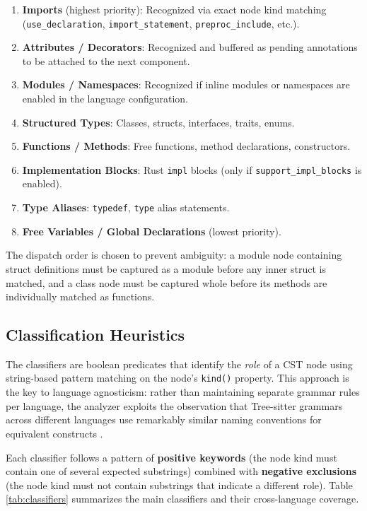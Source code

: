 \begin{enumerate}
  \item \textbf{Imports} (highest priority): Recognized via exact node kind matching (\texttt{use\_declaration}, \texttt{import\_statement}, \texttt{preproc\_include}, etc.).
  \item \textbf{Attributes / Decorators}: Recognized and buffered as pending annotations to be attached to the next component.
  \item \textbf{Modules / Namespaces}: Recognized if inline modules or namespaces are enabled in the language configuration.
  \item \textbf{Structured Types}: Classes, structs, interfaces, traits, enums.
  \item \textbf{Functions / Methods}: Free functions, method declarations, constructors.
  \item \textbf{Implementation Blocks}: Rust \texttt{impl} blocks (only if \texttt{support\_impl\_blocks} is enabled).
  \item \textbf{Type Aliases}: \texttt{typedef}, \texttt{type} alias statements.
  \item \textbf{Free Variables / Global Declarations} (lowest priority).
\end{enumerate}

The dispatch order is chosen to prevent ambiguity: a module node containing struct definitions must be captured as a module before any inner struct is matched, and a class node must be captured whole before its methods are individually matched as functions.

\subsection{Classification Heuristics}
\label{sec:classifiers}

The classifiers are boolean predicates that identify the \textit{role} of a CST node using string-based pattern matching on the node's \texttt{kind()} property. This approach is the key to language agnosticism: rather than maintaining separate grammar rules per language, the analyzer exploits the observation that Tree-sitter grammars across different languages use remarkably similar naming conventions for equivalent constructs \cite{TODO:tree_sitter}.

Each classifier follows a pattern of \textbf{positive keywords} (the node kind must contain one of several expected substrings) combined with \textbf{negative exclusions} (the node kind must not contain substrings that indicate a different role). Table \ref{tab:classifiers} summarizes the main classifiers and their cross-language coverage.

